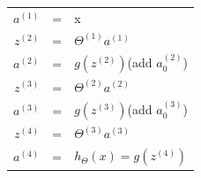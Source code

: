 \documentclass{article}
\begin{document}
\begin{table}[hb]
\begin{center}
\begin{tabular}{rcl}
$a^{(1)}$ &= &x\\
$z^{(2)}$ &= &$\Theta^{(1)}a^{(1)}$\\
$a^{(2)}$ &= &$g(z^{(2)})$(add $a_{0}^{(2)}$)\\
$z^{(3)}$ &= &$\Theta^{(2)}a^{(2)}$\\
$a^{(3)}$ &= &$g(z^{(3)})$(add $a_{0}^{(3)}$)\\
$z^{(4)}$ &= &$\Theta^{(3)}a^{(3)}$\\
$a^{(4)}$ &= &$h_{\Theta}(x)=g(z^{(4)})$\\
\end{tabular}
\end{center}
\end{table}
\end{document}

